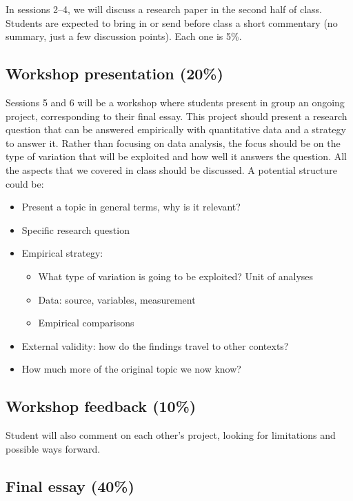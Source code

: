\documentclass[12pt, a4paper]{article}
\begin{document}
In sessions 2--4, we will discuss a research paper in the second half of class. Students are expected to bring in or send before class a short commentary (no summary, just a few discussion points). Each one is 5\%.

\subsection*{Workshop presentation (20\%)}

Sessions 5 and 6 will be a workshop where students present in group an ongoing project, corresponding to their final essay. This project should present a research question that can be answered empirically with quantitative data and a strategy to answer it. Rather than focusing on data analysis, the focus should be on the type of variation that will be exploited and how well it answers the question. All the aspects that we covered in class should be discussed. A potential structure could be:

\begin{itemize}
\setlength\itemsep{-5pt}
  \item Present a topic in general terms, why is it relevant?
  \item Specific research question
  \item Empirical strategy:
  \vspace{-10pt}
  \begin{itemize}
  \setlength\itemsep{-5pt}
    \item What type of variation is going to be exploited? Unit of analyses
    \item Data: source, variables, measurement
    \item Empirical comparisons
  \end{itemize}
  \item External validity: how do the findings travel to other contexts?
  \item How much more of the original topic we now know?
\end{itemize}

\subsection*{Workshop feedback (10\%)}

Student will also comment on each other's project, looking for limitations and possible ways forward.

\subsection*{Final essay (40\%)}
\end{document}

